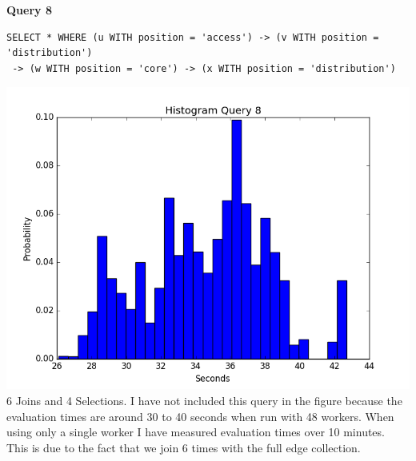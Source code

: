 \documentclass[11pt,singlecolumn]{scrartcl}
\begin{document}
\clearpage
\textbf{Query 8}\\
\begin{verbatim}
SELECT * WHERE (u WITH position = 'access') -> (v WITH position = 'distribution')
 -> (w WITH position = 'core') -> (x WITH position = 'distribution')\end{verbatim}
\includegraphics[width=1\textwidth]{q81}
6 Joins and 4 Selections. I have not included this query in the figure because the evaluation times are around 30 to 40 seconds when run with 48 workers. When using only a single worker I have measured evaluation times over 10 minutes. This is due to the fact that we join 6 times with the full edge collection.
\clearpage
\end{document}
